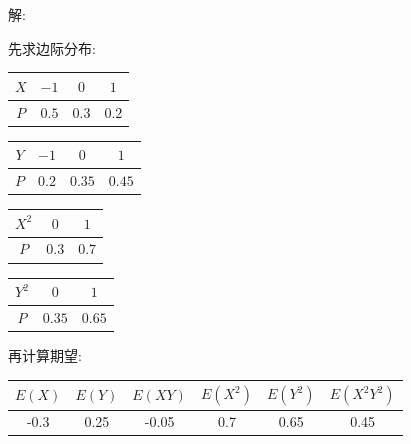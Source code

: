 \documentclass[standard]{ExBook}
\begin{document}
\begin{qitems}
    \begin{bbox}
解: 

先求边际分布:

\vspace{0.5em}
\setlength{\tabcolsep}{1.2em}
\begin{minipage}[c]{0.4\textwidth}
\centering
\begin{tabular}{c|ccc}
    $X$ & $-1$ & $0$ & $1$\\
    \hline
    $P$ & $0.5$ & $0.3$ & $0.2$
\end{tabular}
\end{minipage}
\begin{minipage}[c]{0.6\textwidth}
\centering
\begin{tabular}{c|ccc}
    $Y$ & $-1$ & $0$ & $1$\\
    \hline
    $P$ & $0.2$ & $0.35$ & $0.45$
\end{tabular}
\end{minipage}

\vspace{0.5em}
\setlength{\tabcolsep}{1.75em}
\begin{minipage}[c]{0.4\textwidth}
\centering
\begin{tabular}{c|cc}
    $X^2$ & $0$ & $1$\\
    \hline
    $P$ & $0.3$ & $0.7$
\end{tabular}
\end{minipage}
\begin{minipage}[c]{0.6\textwidth}
\centering
\begin{tabular}{c|cc}
    $Y^2$ & $0$ & $1$\\
    \hline
    $P$ & $0.35$ & $0.65$
\end{tabular}
\end{minipage}
\vspace{0.2em}

再计算期望:

\vspace{0.5em}
\setlength{\tabcolsep}{1.75em}
\begin{minipage}[c]{1\textwidth}
\centering
\begin{tabular}{c|c|c|c|c|c}
    $E(X)$ & $E(Y)$ & $E(XY)$ & $E(X^2)$ & $E(Y^2)$ & $E(X^2 Y^2)$\\
    \hline
    -0.3 & 0.25 & -0.05 & 0.7 & 0.65 & 0.45
\end{tabular}
\end{minipage}
    \end{bbox}


\end{qitems}
\end{document}
